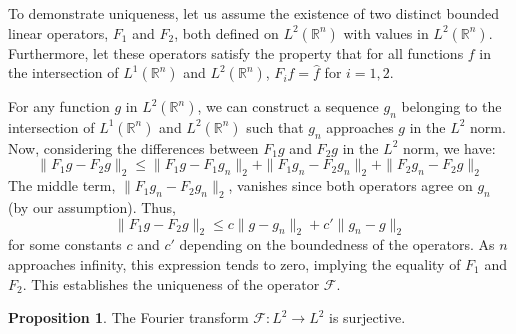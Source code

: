 \documentclass[12pt,openany]{book}
\theoremstyle{definition}
\newtheorem{proposition}[theorem]{Proposition}
\begin{document}
To demonstrate uniqueness, let us assume the existence of two distinct bounded linear operators, $F_1$ and $F_2$, both defined on $L^2(\mathbb{R}^n)$ with values in $L^2(\mathbb{R}^n)$. Furthermore, let these operators satisfy the property that for all functions $f$ in the intersection of $L^1(\mathbb{R}^n)$ and $L^2(\mathbb{R}^n)$, $F_i f = \hat{f}$ for $i = 1,2$.

For any function $g$ in $L^2(\mathbb{R}^n)$, we can construct a sequence ${g_n}$ belonging to the intersection of $L^1(\mathbb{R}^n)$ and $L^2(\mathbb{R}^n)$ such that $g_n$ approaches $g$ in the $L^2$ norm. Now, considering the differences between $F_1 g$ and $F_2 g$ in the $L^2$ norm, we have:
$$\|F_1 g - F_2 g\|_2 \leqslant \|F_1 g - F_1 g_n\|_2 + \|F_1 g_n - F_2 g_n\|_2 + \|F_2 g_n - F_2 g\|_2$$
The middle term, $\|F_1 g_n - F_2 g_n\|_2$, vanishes since both operators agree on $g_n$ (by our assumption). Thus,
$$\|F_1 g - F_2 g\|_2 \leqslant c\|g - g_n\|_2 + c'\|g_n - g\|_2$$
for some constants $c$ and $c'$ depending on the boundedness of the operators. As $n$ approaches infinity, this expression tends to zero, implying the equality of $F_1$ and $F_2$. This establishes the uniqueness of the operator $\mathcal{F}$.
\begin{proposition}
    The Fourier transform $\mathcal{F}: L^2 \rightarrow L^2$ is surjective.
\end{proposition}
\end{document}

